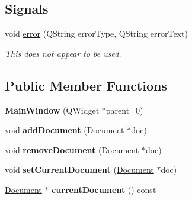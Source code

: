 \subsection*{Signals}
\begin{DoxyCompactItemize}
\item 
\hypertarget{class_main_window_a613d818a5a471cbe170adf837a117b59}{void \hyperlink{class_main_window_a613d818a5a471cbe170adf837a117b59}{error} (Q\-String error\-Type, Q\-String error\-Text)}\label{class_main_window_a613d818a5a471cbe170adf837a117b59}

\begin{DoxyCompactList}\small\item\em This does not appear to be used. \end{DoxyCompactList}\end{DoxyCompactItemize}
\subsection*{Public Member Functions}
\begin{DoxyCompactItemize}
\item 
\hypertarget{class_main_window_a8b244be8b7b7db1b08de2a2acb9409db}{{\bfseries Main\-Window} (Q\-Widget $\ast$parent=0)}\label{class_main_window_a8b244be8b7b7db1b08de2a2acb9409db}

\item 
\hypertarget{class_main_window_adf49ab7cecde8a49010fe32e276c63b5}{void {\bfseries add\-Document} (\hyperlink{class_document}{Document} $\ast$doc)}\label{class_main_window_adf49ab7cecde8a49010fe32e276c63b5}

\item 
\hypertarget{class_main_window_acfdd14cad355ca58d60fd6fa694a58d1}{void {\bfseries remove\-Document} (\hyperlink{class_document}{Document} $\ast$doc)}\label{class_main_window_acfdd14cad355ca58d60fd6fa694a58d1}

\item 
\hypertarget{class_main_window_a67ebc2b9af1051deb93c7316e4ddfd1f}{void {\bfseries set\-Current\-Document} (\hyperlink{class_document}{Document} $\ast$doc)}\label{class_main_window_a67ebc2b9af1051deb93c7316e4ddfd1f}

\item 
\hypertarget{class_main_window_afa31ff82cd6a5a3ee67eccec30c8e608}{\hyperlink{class_document}{Document} $\ast$ {\bfseries current\-Document} () const }\label{class_main_window_afa31ff82cd6a5a3ee67eccec30c8e608}

\end{DoxyCompactItemize}
